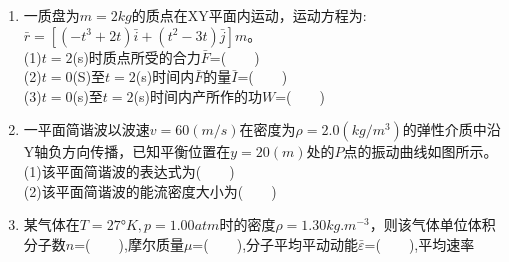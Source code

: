 \begin{enumerate}
\item 一质盘为$m=2kg$的质点在XY平面内运动，运动方程为:$\bar r =[(-t^3+2t)\bar i+(t^2-3t)\bar j]m$。\\
(1)$t=2$(s)时质点所受的合力$\bar F$=($\qquad$)\\
(2)$t=0$(S)至$t=2$(s)时间内$\bar F$的量$\bar I$=($\qquad$)\\
(3)$t=0$(s)至$t=2$(s)时间内产所作的功$W$=($\qquad$)
\item 一平面简谐波以波速$v=60(m/s)$在密度为$\rho=2.0(kg/m^3)$的弹性介质中沿Y轴负方向传播，已知平衡位置在$y=20(m)$处的$P$点的振动曲线如图所示。\\
(1)该平面简谐波的表达式为($\qquad$)\\
(2)该平面简谐波的能流密度大小为($\qquad$)
\item 某气体在$T=27$°$K,p=1.00atm$时的密度$\rho=1.30kg.m^{-3}$，则该气体单位体积分子数$n$=($\qquad$),摩尔质量$\mu$=($\qquad$),分子平均平动动能$\bar \varepsilon$=($\qquad$),平均速率$
$
\end{enumerate}
